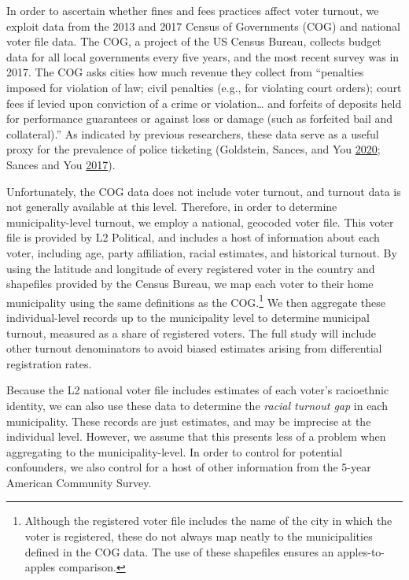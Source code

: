 \documentclass[
  12pt,
]{article}
\begin{document}
In order to ascertain whether fines and fees practices affect voter turnout, we exploit data from the 2013 and 2017 Census of Governments (COG) and national voter file data. The COG, a project of the US Census Bureau, collects budget data for all local governments every five years, and the most recent survey was in 2017. The COG asks cities how much revenue they collect from ``penalties imposed for violation of law; civil penalties (e.g., for violating court orders); court fees if levied upon conviction of a crime or violation\ldots{} and forfeits of deposits held for performance guarantees or against loss or damage (such as forfeited bail and collateral).'' As indicated by previous researchers, these data serve as a useful proxy for the prevalence of police ticketing (Goldstein, Sances, and You \protect\hyperlink{ref-Goldstein2020}{2020}; Sances and You \protect\hyperlink{ref-Sances2017}{2017}).

Unfortunately, the COG data does not include voter turnout, and turnout data is not generally available at this level. Therefore, in order to determine municipality-level turnout, we employ a national, geocoded voter file. This voter file is provided by L2 Political, and includes a host of information about each voter, including age, party affiliation, racial estimates, and historical turnout. By using the latitude and longitude of every registered voter in the country and shapefiles provided by the Census Bureau, we map each voter to their home municipality using the same definitions as the COG.\footnote{Although the registered voter file includes the name of the city in which the voter is registered, these do not always map neatly to the municipalities defined in the COG data. The use of these shapefiles ensures an apples-to-apples comparison.} We then aggregate these individual-level records up to the municipality level to determine municipal turnout, measured as a share of registered voters. The full study will include other turnout denominators to avoid biased estimates arising from differential registration rates.

Because the L2 national voter file includes estimates of each voter's racioethnic identity, we can also use these data to determine the \emph{racial turnout gap} in each municipality. These records are just estimates, and may be imprecise at the individual level. However, we assume that this presents less of a problem when aggregating to the municipality-level. In order to control for potential confounders, we also control for a host of other information from the 5-year American Community Survey.
\end{document}
